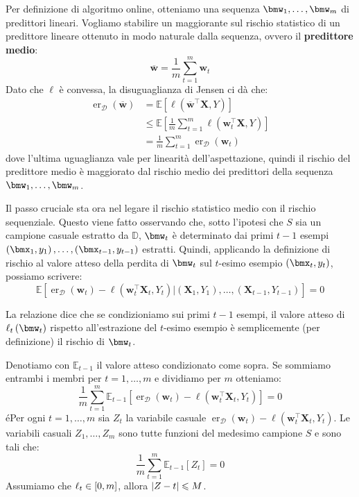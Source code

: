 \documentclass[\main/main.tex]{subfiles}
\begin{document}
\begin{analysis}
\begin{multicols}{2}
        Per definizione di algoritmo online, otteniamo una sequenza \(\bmw_1, \ldots, \bmw_m\) di predittori lineari. Vogliamo stabilire un maggiorante sul rischio statistico di un predittore lineare ottenuto in modo naturale dalla sequenza, ovvero il \textbf{predittore medio}:
        \[\overline{\boldsymbol{w}}=\frac{1}{m} \sum_{t=1}^{m} \boldsymbol{w}_{t}\]
        Dato che \(\ell\) è convessa, la disuguaglianza di Jensen ci dà che:
        \begin{align*}
            \operatorname{er}_{\mathcal{D}}(\overline{\boldsymbol{w}})&=\mathbb{E}\left[\ell\left(\overline{\boldsymbol{w}}^{\top} \boldsymbol{X}, Y\right)\right] \\&\leq \mathbb{E}\left[\frac{1}{m} \sum_{t=1}^{m} \ell\left(\boldsymbol{w}_{t}^{\top} \boldsymbol{X}, Y\right)\right]\\&=\frac{1}{m} \sum_{t=1}^{m} \operatorname{er}_{\mathcal{D}}\left(\boldsymbol{w}_{t}\right)
        \end{align*}
        dove l'ultima uguaglianza vale per linearità dell'aspettazione, quindi il rischio del predittore medio è maggiorato dal rischio medio dei predittori della sequenza \(\bmw_1, \ldots, \bmw_m\).
        
        Il passo cruciale sta ora nel legare il rischio statistico medio con il rischio sequenziale. Questo viene fatto osservando che, sotto l'ipotesi che \(S\) sia un campione casuale estratto da \(\mathbb{D}\), \(\bmw_t\) è determinato dai primi \(t-1\) esempi \(\rnd{\bmx_1, y_1}, \ldots, \rnd{\bmx_{t-1}, y_{t-1}}\) estratti. Quindi, applicando la definizione di rischio al valore atteso della perdita di \(\bmw_t\) sul \(t\)-esimo esempio \(\rnd{\bmx_t, y_t}\), possiamo scrivere:
        \[\mathbb{E}\left[\operatorname{er}_{\mathcal{D}}\left(\boldsymbol{w}_{t}\right)-\ell\left(\boldsymbol{w}_{t}^{\top} \boldsymbol{X}_{t}, Y_{t}\right) |\left(\boldsymbol{X}_{1}, Y_{1}\right), \ldots,\left(\boldsymbol{X}_{t-1}, Y_{t-1}\right)\right]=0\]
        
        La relazione dice che se condizioniamo sui primi \(t-1\) esempi, il valore atteso di \(\ell_t\rnd{\bmw_t}\) rispetto all'estrazione del \(t\)-esimo esempio è semplicemente (per definizione) il rischio di \(\bmw_t\).
        
        Denotiamo con \(\mathbb{E}_{t-1}\) il valore atteso condizionato come sopra. Se sommiamo entrambi i membri per \(t=1, \ldots, m\) e dividiamo per \(m\) otteniamo:
        \[\frac{1}{m} \sum_{t=1}^{m} \mathbb{E}_{t-1}\left[\operatorname{er}_{\mathcal{D}}\left(\boldsymbol{w}_{t}\right)-\ell\left(\boldsymbol{w}_{t}^{\top} \boldsymbol{X}_{t}, Y_{t}\right)\right]=0\]
        éPer ogni \(t=1,\ldots,m\) sia \(Z_t\) la variabile casuale \(\operatorname{er}_{\mathcal{D}}\left(\boldsymbol{w}_{t}\right)-\ell\left(\boldsymbol{w}_{t}^{\top} \boldsymbol{X}_{t}, Y_{t}\right)\). Le variabili casuali \(Z_1, \ldots, Z_m\) sono tutte funzioni del medesimo campione \(S\) e sono tali che:
        \[\frac{1}{m} \sum_{t=1}^{m} \mathbb{E}_{t-1}\left[Z_{t}\right]=0\]
        Assumiamo che \(\ell_t \in \left[0,m\right]\), allora \(\left\lvert Z-t\right\rvert \leqslant M\).
        

\end{multicols}
\end{analysis}
\end{document}
